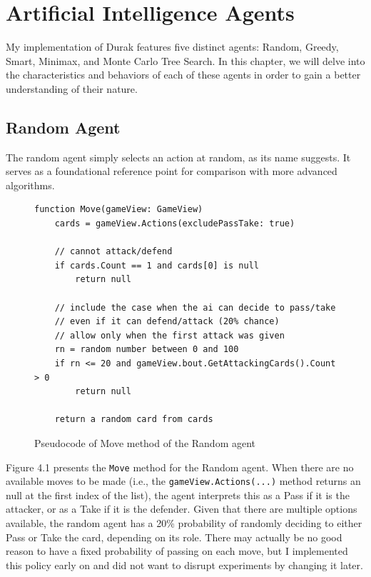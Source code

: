\chapter{Artificial Intelligence Agents}
\label{AIAgents}

My implementation of Durak features five distinct agents: Random, Greedy, Smart, Minimax, and Monte Carlo Tree Search. In this chapter, we will delve into the characteristics and behaviors of each of these agents in order to gain a better understanding of their nature. 

\section{Random Agent}
The random agent simply selects an action at random, as its name suggests. It serves as a foundational reference point for comparison with more advanced algorithms. 

\begin{figure}[h]
\captionsetup{justification=centering}
\begin{lstlisting}
function Move(gameView: GameView)
    cards = gameView.Actions(excludePassTake: true)

    // cannot attack/defend
    if cards.Count == 1 and cards[0] is null
        return null
    
    // include the case when the ai can decide to pass/take
    // even if it can defend/attack (20% chance)
    // allow only when the first attack was given
    rn = random number between 0 and 100
    if rn <= 20 and gameView.bout.GetAttackingCards().Count > 0
        return null
    
    return a random card from cards
\end{lstlisting}
\caption{Pseudocode of Move method of the Random agent}
\label{fig:randomMove}
\end{figure}

Figure 4.1 presents the \texttt{Move} method for the Random agent. When there are no available moves to be made (i.e., the \texttt{gameView.Actions(...)} method returns an null at the first index of the list), the agent interprets this as a Pass if it is the attacker, or as a Take if it is the defender. Given that there are multiple options available, the random agent has a 20\% probability of randomly deciding to either Pass or Take the card, depending on its role. There may actually be no good reason to have a fixed probability of passing on each move, but I implemented this policy early on and did not want to disrupt experiments by changing it later.


